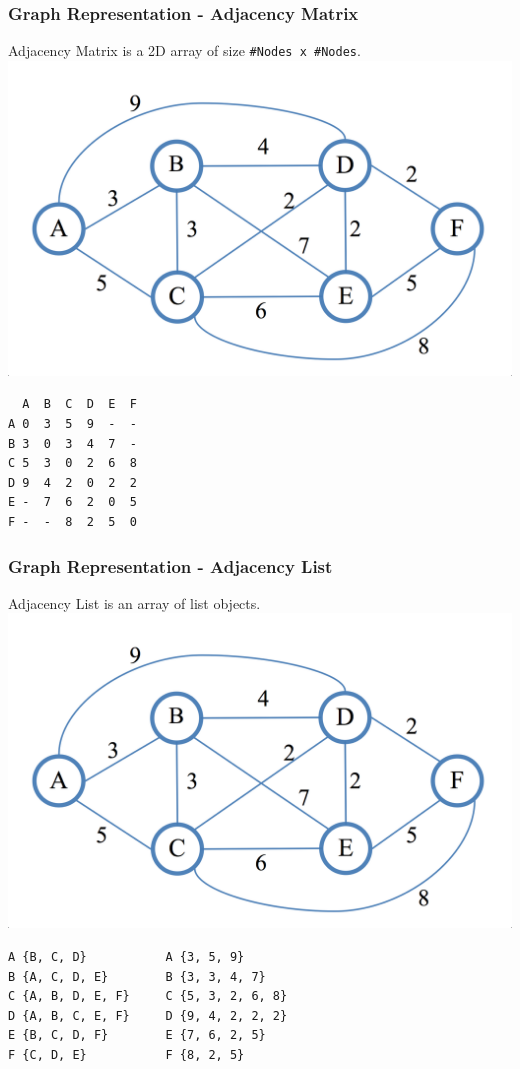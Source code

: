 \begin{frame}[fragile]
\frametitle{Graph Representation - Adjacency Matrix}
Adjacency Matrix is a 2D array of size \verb|#Nodes x #Nodes|.\\
\vspace{3mm}
\includegraphics[scale=0.08]{img/graph.png}\\
\vspace{3mm}
\begin{lstlisting}
  A  B  C  D  E  F
A 0  3  5  9  -  -
B 3  0  3  4  7  -  
C 5  3  0  2  6  8
D 9  4  2  0  2  2
E -  7  6  2  0  5
F -  -  8  2  5  0
\end{lstlisting}
\end{frame}

\begin{frame}[fragile]
\frametitle{Graph Representation - Adjacency List}
Adjacency List is an array of list objects.\\
\vspace{3mm}
\includegraphics[scale=0.08]{img/graph.png}\\
\vspace{3mm}
\begin{lstlisting}
A {B, C, D}           A {3, 5, 9}
B {A, C, D, E}        B {3, 3, 4, 7}
C {A, B, D, E, F}     C {5, 3, 2, 6, 8}
D {A, B, C, E, F}     D {9, 4, 2, 2, 2}
E {B, C, D, F}        E {7, 6, 2, 5}
F {C, D, E}           F {8, 2, 5}
\end{lstlisting}
\end{frame}

